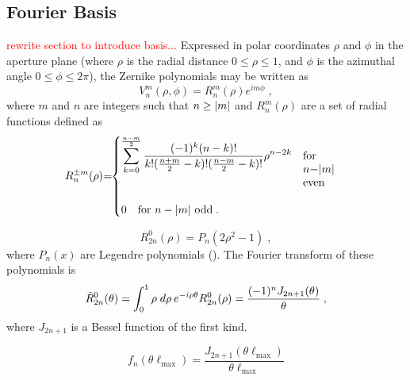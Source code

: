 \subsection{Fourier Basis}
\label{sec:fbasis}
\textcolor{red}{rewrite section to introduce basis...}
Expressed in polar coordinates $\rho$ and $\phi$ in the aperture plane (where $\rho$ is the radial distance $0\leq \rho \leq 1$, and $\phi$ is the azimuthal angle $0\leq \phi \leq 2\pi$), the Zernike polynomials may be written as 
\begin{equation}
V^m_n(\rho,\phi)=R^m_n(\rho)e^{i m\phi}\; ,
\end{equation}
where $m$ and $n$ are integers such that $n \geq \abs{m}$ and $R^m_n (\rho)$ are a set of radial functions defined as 
\begin{equation}
\label{eq:model}
    R^{\pm m}_n(\rho) \hspace{-0.25em} = \hspace{-0.35em}
    \begin{cases}
    \displaystyle 
    \sum_{k=0}^{\frac{n-m}{2}} \frac{(-1)^k(n-k)!}{k!(\frac{n+m}{2}-k)!(\frac{n-m}{2}-k)!}\rho^{n-2k} \hspace{1em} \parbox[t]{1.0cm}{for\hspace{1em} $n - \abs{m}$\\ even}\\
    \\
    0 \hspace{1em}\text{for $n - \abs{m}$ odd}\; .
    \end{cases}
\end{equation}

\begin{equation}
R^0_{2n}(\rho)=P_n(2\rho^2-1)\; ,
\end{equation}
where $P_n(x)$ are Legendre polynomials (\cite{born_1980}). The Fourier transform of these polynomials is
\begin{equation}
\tilde{R}^0_{2n}(\theta) = \int_0^{1} \rho\; d\rho\hspace{0.2em} e^{-i\rho \theta}R^{0}_{2n}(\rho) = \frac{(-1)^n J_{2n+1}(\theta)}{\theta}\;,
\end{equation}
where $J_{2n+1}$ is a Bessel function of the first kind.

\begin{equation}
    f_n(\theta \ell_{\mathrm{max}}) = \frac{J_{2n+1}(\theta \ell_{\mathrm{max}})}{\theta \ell_{\mathrm{max}}}
    \label{eq:f_n}
\end{equation}

